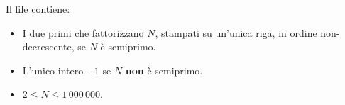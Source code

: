 	\OutputFile
	Il file \outputfile{} contiene:
	\begin{itemize}[nolistsep, itemsep=2mm]
		\item I due primi che fattorizzano $N$, stampati su un'unica riga, in ordine non-decrescente, se $N$ è semiprimo.
		\item L'unico intero $-1$ se $N$ \textbf{non} è semiprimo.
	\end{itemize}
	


\Constraints

\begin{itemize}[nolistsep, itemsep=2mm]
	\item $2 \le N \le 1\,000\,000$.
\end{itemize}


\Examples

\begin{example}
%
%
%
\end{example}


\newpage
\begin{solution}
    
\end{solution}
